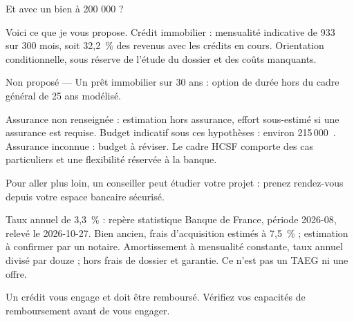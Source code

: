 \documentclass[11pt,a4paper]{article}
\begin{document}
\begin{client}Et avec un bien à 200 000 ?\end{client}
\begin{assistant}Voici ce que je vous propose. Crédit immobilier : mensualité indicative de 933~\texteuro{} sur 300 mois, soit 32,2~\% des revenus avec les crédits en cours. Orientation conditionnelle, sous réserve de l'étude du dossier et des coûts manquants.\par Non proposé — Un prêt immobilier sur 30 ans : option de durée hors du cadre général de 25 ans modélisé.\par Assurance non renseignée : estimation hors assurance, effort sous-estimé si une assurance est requise. Budget indicatif sous ces hypothèses : environ 215\,000~\texteuro{}. Assurance inconnue : budget à réviser. Le cadre HCSF comporte des cas particuliers et une flexibilité réservée à la banque.\par Pour aller plus loin, un conseiller peut étudier votre projet : prenez rendez-vous depuis votre espace bancaire sécurisé.\par Taux annuel de 3,3~\% : repère statistique Banque de France, période 2026-08, relevé le 2026-10-27. Bien ancien, frais d'acquisition estimés à 7,5~\% ; estimation à confirmer par un notaire. Amortissement à mensualité constante, taux annuel divisé par douze ; hors frais de dossier et garantie. Ce n'est pas un TAEG ni une offre.\par Un crédit vous engage et doit être remboursé. Vérifiez vos capacités de remboursement avant de vous engager.\end{assistant}
\end{document}
